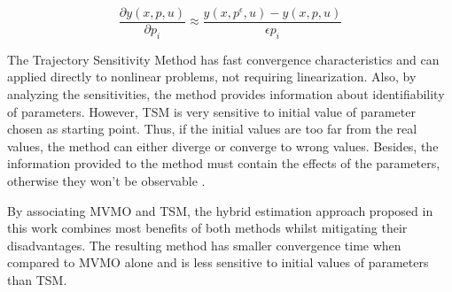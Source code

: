 \begin{equation}
	\frac{\partial y(x, p, u)}{\partial p_{i}} \approx \frac{y(x, p^{\epsilon}, u) - y(x, p, u)}{\epsilon p_{i}}
	\label{eq: diff}
\end{equation}

The Trajectory Sensitivity Method has fast convergence characteristics and can applied directly to nonlinear problems, not requiring linearization. Also, by analyzing the sensitivities, the method provides information about identifiability of parameters. However, TSM is very sensitive to initial value of parameter chosen as starting point. Thus, if the initial values are too far from the real values, the method can either diverge or converge to wrong values. Besides, the information provided to the method must contain the effects of the parameters, otherwise they won't be observable \cite{Benchluch1993}.

By associating MVMO and TSM, the hybrid estimation approach proposed in this work combines most benefits of both methods whilst mitigating their disadvantages. The resulting method has smaller convergence time when compared to MVMO alone and is less sensitive to initial values of parameters than TSM.
